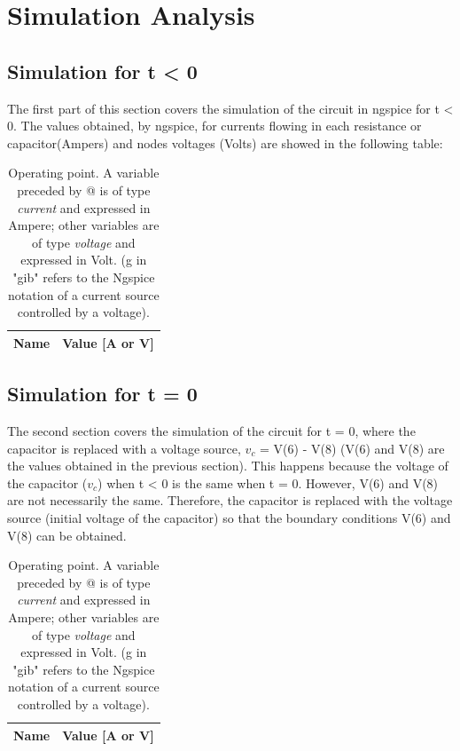 \newpage
\section{Simulation Analysis}
\label{sec:simulation}
\subsection{Simulation for t < 0}
\noindent
The first part of this section covers the simulation of the circuit in ngspice for t < 0.
The values obtained, by ngspice, for currents flowing in each resistance or capacitor(Ampers) and nodes voltages (Volts) are showed in the following table:
\begin{table}[h!]
  \centering
  \begin{tabular}{|c|c|}
    \hline    
    {\bf Name} & {\bf Value [A or V]} \\ \hline
    
  \end{tabular}
  \caption{Operating point. A variable preceded by @ is of type {\em current}
    and expressed in Ampere; other variables are of type {\it voltage} and expressed in
    Volt. (g in "gib" refers to the Ngspice notation of a current source controlled by a voltage).}
  \label{tab:op}
\end{table}

\newpage
\subsection{Simulation for t = 0}
The second section covers the simulation of the circuit for t = 0, where the capacitor is replaced with a voltage source, $v_c$ = V(6) - V(8) (V(6) and V(8) are the values obtained in the previous section). This happens because the voltage of the capacitor ($v_c$) when t < 0 is the same when t = 0. However, V(6) and V(8) are not necessarily the same. Therefore, the capacitor is replaced with the voltage source (initial voltage of the capacitor) so that the boundary conditions V(6) and V(8) can be obtained.
\begin{table}[h!]
  \centering
  \begin{tabular}{|c|c|}
    \hline    
    {\bf Name} & {\bf Value [A or V]} \\ \hline
    
  \end{tabular}
  \caption{Operating point. A variable preceded by @ is of type {\em current}
    and expressed in Ampere; other variables are of type {\it voltage} and expressed in
    Volt. (g in "gib" refers to the Ngspice notation of a current source controlled by a voltage).}
  \label{tab:op2}
\end{table}
\newpage
